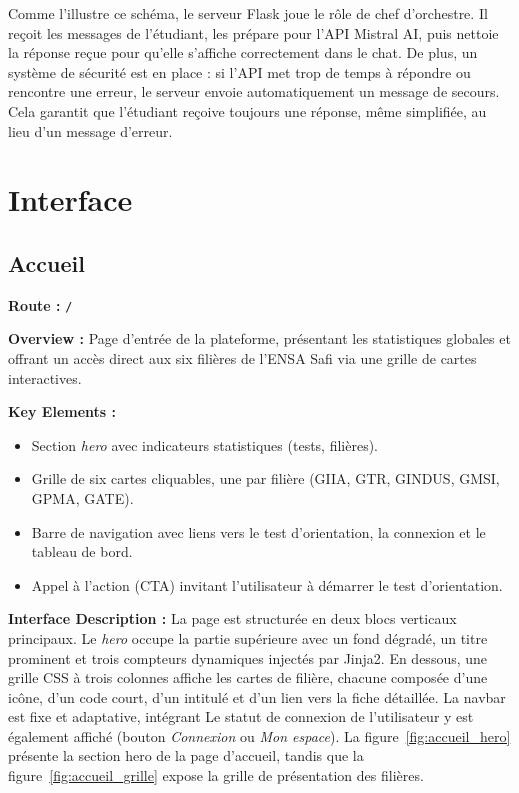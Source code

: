 \documentclass[a4paper,12pt]{article}
\begin{document}
Comme l'illustre ce schéma, le serveur Flask joue le rôle de chef d'orchestre. Il reçoit les messages de l'étudiant, les prépare pour l'API Mistral AI, puis nettoie la réponse reçue pour qu'elle s'affiche correctement dans le chat. De plus, un système de sécurité est en place : si l'API met trop de temps à répondre ou rencontre une erreur, le serveur envoie automatiquement un message de secours. Cela garantit que l'étudiant reçoive toujours une réponse, même simplifiée, au lieu d'un message d'erreur.
\clearpage
\section{Interface}

\subsection{Accueil}

\textbf{Route :} \texttt{/}

\textbf{Overview :}
Page d'entrée de la plateforme, présentant les statistiques globales et offrant un accès
direct aux six filières de l'ENSA Safi via une grille de cartes interactives.

\textbf{Key Elements :}
\begin{itemize}
    \item Section \textit{hero} avec indicateurs statistiques (tests, filières).
    \item Grille de six cartes cliquables, une par filière (GIIA, GTR, GINDUS, GMSI, GPMA, GATE).
    \item Barre de navigation avec liens vers le test d'orientation, la connexion et le tableau de bord.
    \item Appel à l'action (CTA) invitant l'utilisateur à démarrer le test d'orientation.
\end{itemize}
\textbf{Interface Description :}
La page est structurée en deux blocs verticaux principaux. Le \textit{hero} occupe la partie supérieure
avec un fond dégradé, un titre prominent et trois compteurs dynamiques injectés par Jinja2. En dessous,
une grille CSS à trois colonnes affiche les cartes de filière, chacune composée d'une icône, d'un code
court, d'un intitulé et d'un lien vers la fiche détaillée. La navbar est fixe et adaptative, intégrant
Le statut de connexion de l'utilisateur y est également affiché (bouton \textit{Connexion} ou \textit{Mon espace}). La figure~\ref{fig:accueil_hero} présente la section hero de la page d'accueil, tandis que la figure~\ref{fig:accueil_grille} expose la grille de présentation des filières.
\end{document}
